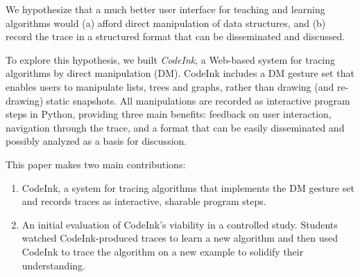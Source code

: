 We hypothesize that a much better user interface for teaching and learning
algorithms would (a) afford direct manipulation of data structures, and (b)
record the trace in a structured format that can be disseminated and discussed.

To explore this hypothesis, we built \emph{CodeInk}, a Web-based system for tracing
algorithms by direct manipulation (DM). CodeInk includes a DM gesture set that
enables users to manipulate lists, trees and graphs, rather than drawing (and re-drawing)
static snapshots. All manipulations are recorded as
interactive program steps in Python, providing
three main benefits: feedback on user interaction, navigation through the
trace, and a format that can be easily disseminated and possibly analyzed as a basis for
discussion. 

This paper makes two main contributions:

\begin{enumerate}\itemsep0pt


\item CodeInk, a system for tracing algorithms that implements the DM
gesture set and records traces as interactive, sharable program steps.

\item An initial evaluation of CodeInk's viability in a controlled
study. Students watched CodeInk-produced traces to learn a new algorithm
and then used CodeInk to trace the algorithm on a new example to
solidify their understanding.

\end{enumerate}

